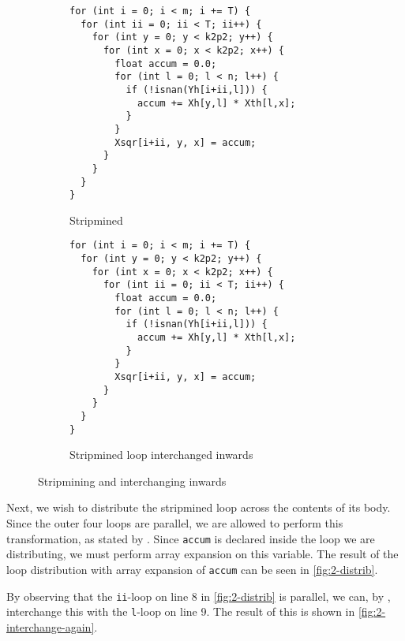 \begin{figure}[H]
\centering
\begin{subfigure}{.55\textwidth}
  \centering
\begin{verbatim}
for (int i = 0; i < m; i += T) {
  for (int ii = 0; ii < T; ii++) {
    for (int y = 0; y < k2p2; y++) {
      for (int x = 0; x < k2p2; x++) {
        float accum = 0.0;
        for (int l = 0; l < n; l++) {
          if (!isnan(Yh[i+ii,l])) {
            accum += Xh[y,l] * Xth[l,x];
          }
        }
        Xsqr[i+ii, y, x] = accum;
      }
    }
  }
}
\end{verbatim}
  \caption{Stripmined}
  \label{fig:2-stripmine}
\end{subfigure}%
\begin{subfigure}{.5\textwidth}
  \centering
\begin{verbatim}
for (int i = 0; i < m; i += T) {
  for (int y = 0; y < k2p2; y++) {
    for (int x = 0; x < k2p2; x++) {
      for (int ii = 0; ii < T; ii++) {
        float accum = 0.0;
        for (int l = 0; l < n; l++) {
          if (!isnan(Yh[i+ii,l])) {
            accum += Xh[y,l] * Xth[l,x];
          }
        }
        Xsqr[i+ii, y, x] = accum;
      }
    }
  }
}
\end{verbatim}
  \caption{Stripmined loop interchanged inwards}
  \label{fig:2-interchange}
\end{subfigure}
\caption{Stripmining and interchanging inwards}
\label{fig:2-opt-1-badname}
\end{figure}

Next, we wish to distribute the stripmined loop across the contents of its
body.
Since the outer four loops are parallel, we are allowed to perform this
transformation, as stated by \cite[corollary 3]{pmph}.
Since \texttt{accum} is declared inside the loop we are distributing, we
must perform array expansion on this variable.
The result of the loop distribution with array expansion of \texttt{accum} can
be seen in \autoref{fig:2-distrib}.

By observing that the \texttt{ii}-loop on line 8 in \autoref{fig:2-distrib}
is parallel, we can, by \cite[corollary 2]{pmph}, interchange this with the
\texttt{l}-loop on line 9.
The result of this is shown in \autoref{fig:2-interchange-again}.

